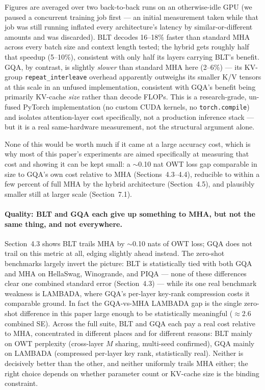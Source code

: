 \documentclass[11pt]{article}
\begin{document}
Figures are averaged over two back-to-back runs on an otherwise-idle GPU (we paused a concurrent training job first --- an initial measurement taken while that job was still running inflated every architecture's latency by similar-or-different amounts and was discarded). BLT decodes 16--18\% faster than standard MHA across every batch size and context length tested; the hybrid gets roughly half that speedup (5--10\%), consistent with only half its layers carrying BLT's benefit. GQA, by contrast, is slightly \emph{slower} than standard MHA here (2--6\%) --- its KV-group \texttt{repeat\_interleave} overhead apparently outweighs its smaller K/V tensors at this scale in an unfused implementation, consistent with GQA's benefit being primarily KV-cache \emph{size} rather than decode FLOPs. This is a research-grade, un-fused PyTorch implementation (no custom CUDA kernels, no \texttt{torch.compile}) and isolates attention-layer cost specifically, not a production inference stack --- but it is a real same-hardware measurement, not the structural argument alone.

None of this would be worth much if it came at a large accuracy cost, which is why most of this paper's experiments are aimed specifically at measuring that cost and showing it can be kept small: a $\sim$0.10 nat OWT loss gap comparable in size to GQA's own cost relative to MHA (Sections~4.3--4.4), reducible to within a few percent of full MHA by the hybrid architecture (Section~4.5), and plausibly smaller still at larger scale (Section~7.1).

\paragraph{Quality: BLT and GQA each give up something to MHA, but not the same thing, and not everywhere.} Section~4.3 shows BLT trails MHA by $\sim$0.10 nats of OWT loss; GQA does not trail on this metric at all, edging slightly ahead instead. The zero-shot benchmarks largely invert the picture: BLT is statistically tied with both GQA and MHA on HellaSwag, Winogrande, and PIQA --- none of these differences clear one combined standard error (Section~4.3) --- while its one real benchmark weakness is LAMBADA, where GQA's per-layer key-rank compression costs it comparable ground. In fact the GQA-vs-MHA LAMBADA gap is the single zero-shot difference in this paper large enough to be statistically meaningful ($\approx$2.6 combined SE). Across the full suite, BLT and GQA each pay a real cost relative to MHA, concentrated in different places and for different reasons: BLT mainly on OWT perplexity (cross-layer $M$ sharing, multi-seed confirmed), GQA mainly on LAMBADA (compressed per-layer key rank, statistically real). Neither is decisively better than the other, and neither uniformly trails MHA either; the right choice depends on whether parameter count or KV-cache size is the binding constraint.
\end{document}
